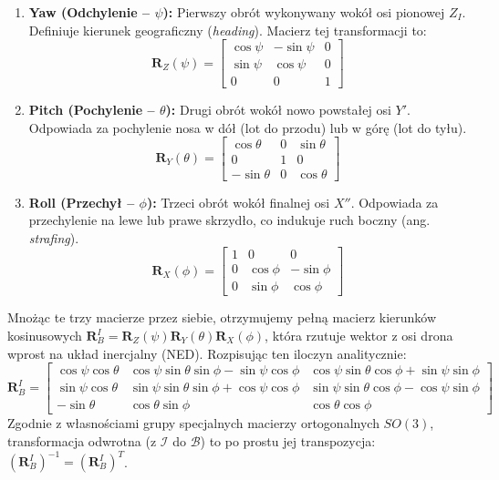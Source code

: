 \begin{enumerate}
    \item \textbf{Yaw (Odchylenie -- $\psi$):} Pierwszy obrót wykonywany wokół osi pionowej $Z_I$. Definiuje kierunek geograficzny (\textit{heading}). Macierz tej transformacji to:
    \begin{equation}
        \mathbf{R}_Z(\psi) = \begin{bmatrix} \cos\psi & -\sin\psi & 0 \\ \sin\psi & \cos\psi & 0 \\ 0 & 0 & 1 \end{bmatrix}
    \end{equation}
    \item \textbf{Pitch (Pochylenie -- $\theta$):} Drugi obrót wokół nowo powstałej osi $Y'$. Odpowiada za pochylenie nosa w dół (lot do przodu) lub w górę (lot do tyłu).
    \begin{equation}
        \mathbf{R}_Y(\theta) = \begin{bmatrix} \cos\theta & 0 & \sin\theta \\ 0 & 1 & 0 \\ -\sin\theta & 0 & \cos\theta \end{bmatrix}
    \end{equation}
    \item \textbf{Roll (Przechył -- $\phi$):} Trzeci obrót wokół finalnej osi $X''$. Odpowiada za przechylenie na lewe lub prawe skrzydło, co indukuje ruch boczny (ang. \textit{strafing}).
    \begin{equation}
        \mathbf{R}_X(\phi) = \begin{bmatrix} 1 & 0 & 0 \\ 0 & \cos\phi & -\sin\phi \\ 0 & \sin\phi & \cos\phi \end{bmatrix}
    \end{equation}
\end{enumerate}

Mnożąc te trzy macierze przez siebie, otrzymujemy pełną macierz kierunków kosinusowych $\mathbf{R}_{B}^{I} = \mathbf{R}_Z(\psi) \mathbf{R}_Y(\theta) \mathbf{R}_X(\phi)$, która rzutuje wektor z osi drona wprost na układ inercjalny (NED). Rozpisując ten iloczyn analitycznie:
\begin{equation}
\mathbf{R}_{B}^{I} = 
\begin{bmatrix}
\cos\psi \cos\theta & \cos\psi \sin\theta \sin\phi - \sin\psi \cos\phi & \cos\psi \sin\theta \cos\phi + \sin\psi \sin\phi \\
\sin\psi \cos\theta & \sin\psi \sin\theta \sin\phi + \cos\psi \cos\phi & \sin\psi \sin\theta \cos\phi - \cos\psi \sin\phi \\
-\sin\theta & \cos\theta \sin\phi & \cos\theta \cos\phi
\end{bmatrix}
\end{equation}
Zgodnie z własnościami grupy specjalnych macierzy ortogonalnych $SO(3)$, transformacja odwrotna (z $\mathcal{I}$ do $\mathcal{B}$) to po prostu jej transpozycja: $(\mathbf{R}_{B}^{I})^{-1} = (\mathbf{R}_{B}^{I})^T$.

